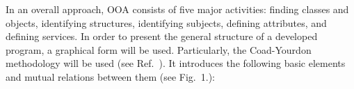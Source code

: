 \documentclass[a4paper]{article}
\begin{document}
In an overall approach, OOA consists of five major activities: finding classes and objects, identifying structures, identifying subjects, defining attributes, and defining services.
In order to present the general structure of a developed program, 
a graphical form will be used. Particularly, the Coad-Yourdon methodology
will be used (see Ref.~\cite{CoadYourdon}). It introduces the following basic elements and mutual
relations between them (see Fig.~1.):

\end{document}
